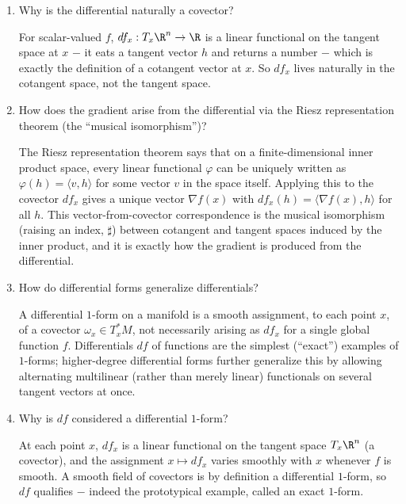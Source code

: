 \documentclass{self-check}
\begin{document}
\begin{enumerate}[resume, leftmargin=*, itemsep=8pt]
\begin{answer}
    \end{answer}
  \item Why is the differential naturally a covector?
    \begin{answer}
      For scalar-valued \(f\), \(df_{x}:T_{x}\R^{n}\to\R\) is a linear functional on the tangent space at \(x\) \(-\) it eats a tangent vector \(h\) and returns a number \(-\) which is exactly the definition of a cotangent vector at \(x\). So \(df_{x}\) lives naturally in the cotangent space, not the tangent space.
    \end{answer}
  \item How does the gradient arise from the differential via the Riesz representation theorem (the ``musical isomorphism'')?
    \begin{answer}
      The Riesz representation theorem says that on a finite-dimensional inner product space, every linear functional \(\varphi\) can be uniquely written as \(\varphi(h)=\langle v,h\rangle\) for some vector \(v\) in the space itself. Applying this to the covector \(df_{x}\) gives a unique vector \(\nabla f(x)\) with \(df_{x}(h)=\langle\nabla f(x),h\rangle\) for all \(h\). This vector-from-covector correspondence is the musical isomorphism (raising an index, \(\sharp\)) between cotangent and tangent spaces induced by the inner product, and it is exactly how the gradient is produced from the differential.
    \end{answer}
  \item How do differential forms generalize differentials?
    \begin{answer}
      A differential \(1\)-form on a manifold is a smooth assignment, to each point \(x\), of a covector \(\omega_{x}\in T_{x}^{*}M\), not necessarily arising as \(df_{x}\) for a single global function \(f\). Differentials \(df\) of functions are the simplest (``exact'') examples of \(1\)-forms; higher-degree differential forms further generalize this by allowing alternating multilinear (rather than merely linear) functionals on several tangent vectors at once.
    \end{answer}
  \item Why is \(df\) considered a differential \(1\)-form?
    \begin{answer}
      At each point \(x\), \(df_{x}\) is a linear functional on the tangent space \(T_{x}\R^{n}\) (a covector), and the assignment \(x\mapsto df_{x}\) varies smoothly with \(x\) whenever \(f\) is smooth. A smooth field of covectors is by definition a differential \(1\)-form, so \(df\) qualifies \(-\) indeed the prototypical example, called an exact \(1\)-form.

\end{answer}
\end{enumerate}
\end{document}
